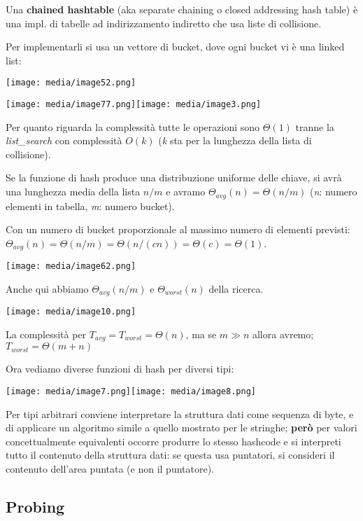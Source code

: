 Una \textbf{chained hashtable} (aka separate chaining o closed
addressing hash table) è una impl. di tabelle ad indirizzamento
indiretto che usa liste di collisione.

Per implementarli si usa un vettore di bucket, dove ogni bucket vi è una
linked list:

\texttt{[image: media/image52.png]}

\texttt{[image: media/image77.png]}\texttt{[image: media/image3.png]}

Per quanto riguarda la complessità tutte le operazioni sono
\(\Theta(1)\) tranne la \emph{list\_search} con complessità \(O(k)\)
(\emph{k} sta per la lunghezza della lista di collisione).

Se la funzione di hash produce una distribuzione uniforme delle chiave,
si avrà una lunghezza media della lista \(n/m\) e avramo
\(\Theta_{avg}(n) = \Theta(n/m)\) (\emph{n}: numero elementi in tabella,
\emph{m}: numero bucket).

Con un numero di bucket proporzionale al massimo numero di elementi
previsti:
\(\Theta_{avg}(n) = \Theta(n/m) = \Theta(n/(cn)) = \Theta(c) = \Theta(1)\).

\texttt{[image: media/image62.png]}

Anche qui abbiamo \(\Theta_{avg}(n/m)\) e \(\Theta_{worst}(n)\) della
ricerca.

\texttt{[image: media/image10.png]}

La complessità per \(T_{avg} = T_{worst} = \Theta(n)\), ma se
\(m \gg n\) allora avremo; \(T_{worst} = \Theta(m + n)\)

Ora vediamo diverse funzioni di hash per diversi tipi:

\texttt{[image: media/image7.png]}\texttt{[image: media/image8.png]}

Per tipi arbitrari conviene interpretare la struttura dati come sequenza
di byte, e di applicare un algoritmo simile a quello mostrato per le
stringhe; \textbf{però} per valori concettualmente equivalenti occorre
produrre lo stesso hashcode e si interpreti tutto il contenuto della
struttura dati: se questa usa puntatori, si consideri il contenuto
dell'area puntata (e non il puntatore).

\subsection{\texorpdfstring{Probing }{Probing }}\label{probing}

